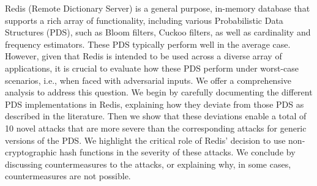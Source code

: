 Redis (Remote Dictionary Server) is a general purpose, in-memory database that supports a rich array of functionality, including various Probabilistic Data Structures (PDS), such as Bloom filters, Cuckoo filters, as well as cardinality and frequency estimators. 
These PDS typically perform well in the average case. However, given that Redis is intended to be used across a diverse array of applications, it is crucial to evaluate how these PDS perform under worst-case scenarios, i.e., when faced with adversarial inputs. We offer a comprehensive analysis to address this question.
We begin by carefully documenting the different PDS implementations in Redis, explaining how they deviate from those PDS as described in the literature. 
Then we show that these deviations enable a total of 10 novel attacks that are more severe than the corresponding attacks for generic versions of the PDS. 
We highlight the critical role of Redis' decision to use non-cryptographic hash functions in the severity of these attacks. 
We conclude by discussing countermeasures to the attacks, or explaining why, in some cases, countermeasures are not possible.